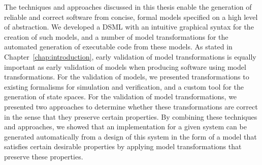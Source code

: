 
The techniques and approaches discussed in this thesis enable the generation of reliable and correct software from concise, formal models specified on a high level of abstraction.
We developed a DSML with an intuitive graphical syntax for the creation of such models, and a number of model transformations for the automated generation of executable code from these models.
As stated in Chapter~\ref{chap:introduction}, early validation of model transformations is equally important as early validation of models when producing software using model transformations.
For the validation of models, we presented transformations to existing formalisms for simulation and verification, and a custom tool for the generation of state spaces.
For the validation of model transformations, we presented two approaches to determine whether these transformations are correct in the sense that they preserve certain properties.
By combining these techniques and approaches, we showed that an implementation for a given system can be generated automatically from a design of this system in the form of a model that satisfies certain desirable properties by applying model transformations that preserve these properties. 